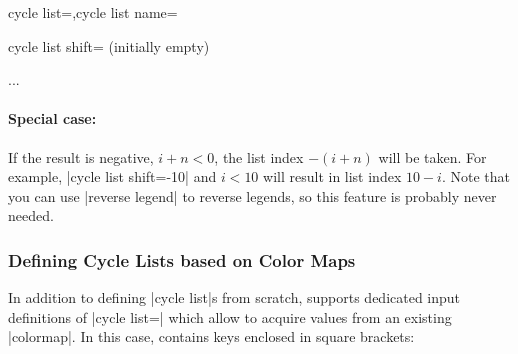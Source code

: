 \begin{pgfplotskeylist}{cycle list=,cycle list name=}
\begin{pgfplotskey}{cycle list shift= (initially empty)}
\begin{codeexample}
    \pgfplotsset{cycle list shift=-1}
\addplot ...
\end{codeexample}

        \paragraph{Special case:}

        If the result is negative, $i+n <0$, the list index $-(i+n)$ will be
        taken. For example, |cycle list shift=-10| and $i<10$ will result in
        list index $10-i$. Note that you can use |reverse legend| to reverse
        legends, so this feature is probably never needed.
    \end{pgfplotskey}


    \subsubsection{Defining Cycle Lists based on Color Maps}

    In addition to defining |cycle list|s from scratch, \PGFPlots{} supports
    dedicated input definitions of |cycle list=| which allow to
    acquire values from an existing |colormap|. In this case, 
    contains keys enclosed in square brackets:

{%

}
\end{pgfplotskeylist}
